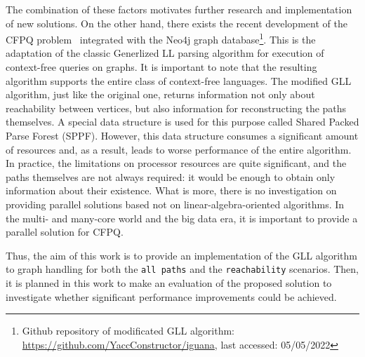 The combination of these factors motivates further research and implementation of new solutions. On the other hand, there exists the recent development of the CFPQ problem~\cite{10.1007/978-3-662-46663-6_5} integrated with the Neo4j graph database\footnote{ Github repository of modificated GLL algorithm: \url{https://github.com/YaccConstructor/iguana},  last accessed: 05/05/2022}. This is the adaptation of the classic Generlized LL parsing algorithm for execution of context-free queries on graphs. It is important to note that the resulting algorithm supports the entire class of context-free languages. The modified GLL algorithm, just like the original one, returns information not only about reachability between vertices, but also information for reconstructing the paths themselves. A special data structure is used for this purpose called Shared Packed Parse Forest (SPPF).
However, this data structure consumes a significant amount of resources and, as a result, leads to worse performance of the entire algorithm. In practice, the limitations on processor resources are quite significant, and the paths themselves are not always required: it would be enough to obtain only information about their existence. What is more, there is no investigation on providing parallel solutions based not on linear-algebra-oriented algorithms. In the multi- and many-core world and the big data era, it is important to provide a parallel solution for CFPQ. 

Thus, the aim of this work is to provide an implementation of the GLL algorithm to graph handling for both the \texttt{all paths} and the \texttt{reachability} scenarios. Then, it is planned in this work to make an evaluation of the proposed solution to investigate whether significant performance improvements could be achieved.
